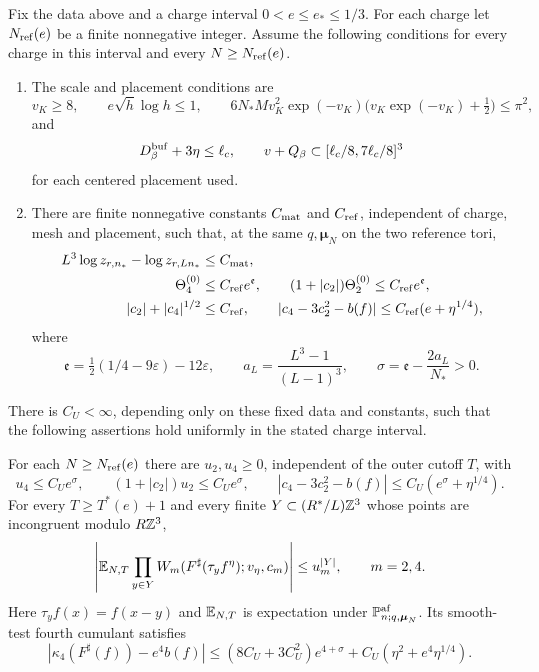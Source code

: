 \begin{theorem}\label{thm:vtm-main}
Fix the data above and a charge interval $0<e\le e_*\le1/3$.
For each charge let $N_{\rm ref}(e)$ be a finite nonnegative integer.
Assume the following conditions for every charge in this interval
and every $N\ge N_{\rm ref}(e)$.
\begin{enumerate}[label=\textup{(\roman*)}]
\item The scale and placement conditions are
\[
 v_K\ge8,\qquad e\sqrt h\log h\le1,\qquad
 6N_*Mv_K^2\exp(-v_K)
          \bigl(v_K\exp(-v_K)+\tfrac12\bigr)\le\pi^2,
\]
and
\begin{equation}\label{eq:cells-fit}
 D_\beta^{\rm buf}+3\eta\le\ell_c,\qquad
 v+Q_\beta\subset[\ell_c/8,7\ell_c/8]^3
\end{equation}
for each centered placement used.
\item There are finite nonnegative constants $C_{\rm mat}$ and
$C_{\rm ref}$, independent of charge, mesh and placement, such that,
at the same $q,\boldsymbol\mu_N$ on the two reference tori,
\begin{align}
 L^3\log z_{r,n_*}-\log z_{r,Ln_*}&\le C_{\rm mat},\notag\\
 \Theta_4^{(0)}&\le C_{\rm ref}e^{\mathfrak e},\qquad
 (1+|c_2|)\Theta_2^{(0)}\le C_{\rm ref}e^{\mathfrak e},
 \label{eq:vtm-reference-hypotheses}\\
 |c_2|+|c_4|^{1/2}&\le C_{\rm ref},\qquad
 |c_4-3c_2^2-b(f)|\le C_{\rm ref}(e+\eta^{1/4}),\notag
\end{align}
where
\[
 \mathfrak e=\tfrac12(1/4-9\varepsilon)-12\varepsilon,\qquad
 a_L=\frac{L^3-1}{(L-1)^3},\qquad
 \sigma=\mathfrak e-\frac{2a_L}{N_*}>0.
\]
\end{enumerate}
There is $C_U<\infty$, depending only on these fixed data and
constants, such that the following assertions hold uniformly
in the stated charge interval.

For each $N\ge N_{\rm ref}(e)$ there are $u_2,u_4\ge0$,
independent of the outer cutoff $T$, with
\begin{equation}\label{eq:vtm-main-errors}
 u_4\le C_Ue^\sigma,\qquad
 (1+|c_2|)u_2\le C_Ue^\sigma,\qquad
 |c_4-3c_2^2-b(f)|\le C_U(e^\sigma+\eta^{1/4}).
\end{equation}
For every $T\ge T^*(e)+1$ and every finite
$Y\subset(R^*/L)\mathbb Z^3$ whose points are incongruent modulo $R\mathbb Z^3$,
\begin{equation}\label{eq:vtm-main-products}
 \left|\mathbb E_{N,T}\prod_{y\in Y}
 W_m(F^\sharp(\tau_yf^\eta);v_\eta,c_m)\right|
              \le u_m^{|Y|},\qquad m=2,4.
\end{equation}
Here $\tau_yf(x)=f(x-y)$ and $\mathbb E_{N,T}$ is expectation under
$\mathbb P_{n;q,\boldsymbol\mu_N}^{\rm af}$. Its smooth-test
fourth cumulant satisfies
\begin{equation}\label{eq:vtm-main-finite-cumulant}
 |\kappa_4(F^\sharp(f))-e^4b(f)|
 \le(8C_U+3C_U^2)e^{4+\sigma}
                  +C_U(\eta^2+e^4\eta^{1/4}).
\end{equation}


\end{theorem}
